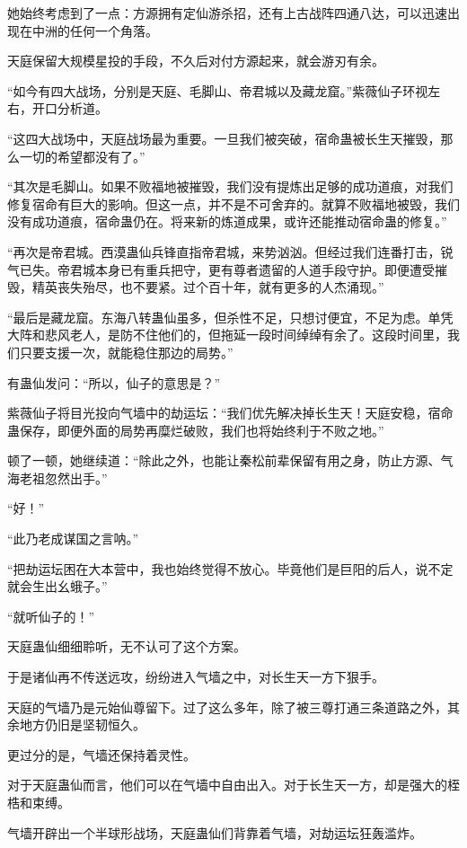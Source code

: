 \begin{this_body}
她始终考虑到了一点：方源拥有定仙游杀招，还有上古战阵四通八达，可以迅速出现在中洲的任何一个角落。

天庭保留大规模星投的手段，不久后对付方源起来，就会游刃有余。

“如今有四大战场，分别是天庭、毛脚山、帝君城以及藏龙窟。”紫薇仙子环视左右，开口分析道。

“这四大战场中，天庭战场最为重要。一旦我们被突破，宿命蛊被长生天摧毁，那么一切的希望都没有了。”

“其次是毛脚山。如果不败福地被摧毁，我们没有提炼出足够的成功道痕，对我们修复宿命有巨大的影响。但这一点，并不是不可舍弃的。就算不败福地被毁，我们没有成功道痕，宿命蛊仍在。将来新的炼道成果，或许还能推动宿命蛊的修复。”

“再次是帝君城。西漠蛊仙兵锋直指帝君城，来势汹汹。但经过我们连番打击，锐气已失。帝君城本身已有重兵把守，更有尊者遗留的人道手段守护。即便遭受摧毁，精英丧失殆尽，也不要紧。过个百十年，就有更多的人杰涌现。”

“最后是藏龙窟。东海八转蛊仙虽多，但杀性不足，只想讨便宜，不足为虑。单凭大阵和悲风老人，是防不住他们的，但拖延一段时间绰绰有余了。这段时间里，我们只要支援一次，就能稳住那边的局势。”

有蛊仙发问：“所以，仙子的意思是？”

紫薇仙子将目光投向气墙中的劫运坛：“我们优先解决掉长生天！天庭安稳，宿命蛊保存，即便外面的局势再糜烂破败，我们也将始终利于不败之地。”

顿了一顿，她继续道：“除此之外，也能让秦松前辈保留有用之身，防止方源、气海老祖忽然出手。”

“好！”

“此乃老成谋国之言呐。”

“把劫运坛困在大本营中，我也始终觉得不放心。毕竟他们是巨阳的后人，说不定就会生出幺蛾子。”

“就听仙子的！”

天庭蛊仙细细聆听，无不认可了这个方案。

于是诸仙再不传送远攻，纷纷进入气墙之中，对长生天一方下狠手。

天庭的气墙乃是元始仙尊留下。过了这么多年，除了被三尊打通三条道路之外，其余地方仍旧是坚韧恒久。

更过分的是，气墙还保持着灵性。

对于天庭蛊仙而言，他们可以在气墙中自由出入。对于长生天一方，却是强大的桎梏和束缚。

气墙开辟出一个半球形战场，天庭蛊仙们背靠着气墙，对劫运坛狂轰滥炸。


\end{this_body}
